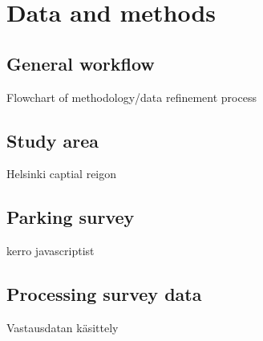 \section{Data and methods}
\subsection{General workflow}
\justify
Flowchart of methodology/data refinement process

\subsection{Study area}
\justify
Helsinki captial reigon

\subsection{Parking survey}
\justify
kerro javascriptist

\subsection{Processing survey data}
\justify
Vastausdatan käsittely